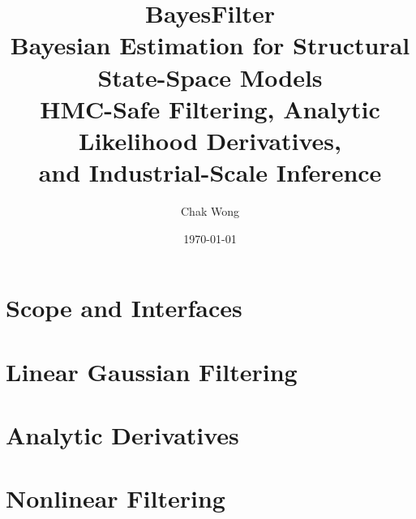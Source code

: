 \documentclass[12pt,a4paper,openany]{book}
\title{\Huge\textbf{BayesFilter}\\[12pt]
  \Large Bayesian Estimation for Structural State-Space Models\\[4pt]
  \large HMC-Safe Filtering, Analytic Likelihood Derivatives,\\
  and Industrial-Scale Inference}
\author{Chak Wong}
\date{\today}
\begin{document}
\frontmatter
\maketitle
\tableofcontents

\mainmatter

\part{Scope and Interfaces}





\part{Linear Gaussian Filtering}





\part{Analytic Derivatives}







\part{Nonlinear Filtering}

















\end{document}
